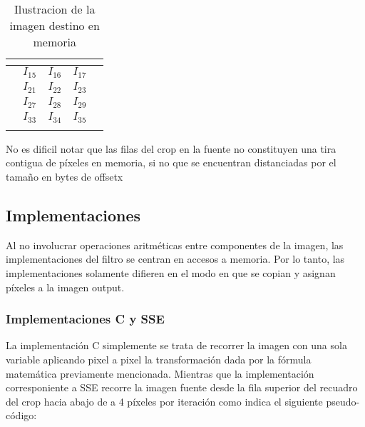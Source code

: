 \begin{table}[h]
\centering
\mem
\begin{tabular}{l|c|c|c|l}
& \multicolumn{1}{l|}{}       & \multicolumn{1}{l|}{}       & \multicolumn{1}{l|}{}      &  \\ \hline
 & \cellcolor[HTML]{FD6864}$I_{15}$ & \cellcolor[HTML]{FD6864}$I_{16}$  & \cellcolor[HTML]{FD6864}$I_{17}$ &  \\ \hline
 & \cellcolor[HTML]{FD6864}$I_{21}$ & \cellcolor[HTML]{FD6864}$I_{22}$  & \cellcolor[HTML]{FD6864}$I_{23}$ &  \\ \hline 
   & \cellcolor[HTML]{FD6864}$I_{27}$  & \cellcolor[HTML]{FD6864}$I_{28}$  & \cellcolor[HTML]{FD6864}$I_{29}$ &  \\ \hline
 & \cellcolor[HTML]{FD6864}$I_{33}$  & \cellcolor[HTML]{FD6864}$I_{34}$  & \cellcolor[HTML]{FD6864}$I_{35}$ &  \\ \hline
  & \multicolumn{1}{l|}{}       & \multicolumn{1}{l|}{}       & \multicolumn{1}{l|}{}      &
\end{tabular}
\caption{Ilustracion de la imagen destino en memoria}
\end{table}




No es dificil notar que las filas del crop en la fuente no constituyen una tira contigua de píxeles en memoria, si no que se encuentran distanciadas por el tamaño en bytes de offsetx

\subsection{Implementaciones}
Al no involucrar operaciones aritméticas entre componentes de la imagen, las implementaciones del filtro se centran en accesos a memoria. Por lo tanto, las implementaciones solamente difieren en el modo en que se copian y asignan píxeles a la imagen output. 
\subsubsection{Implementaciones C y SSE}
La implementación C simplemente se trata de recorrer la imagen con una sola variable aplicando pixel a pixel la transformación dada por la fórmula matemática previamente mencionada. Mientras que la implementación corresponiente a SSE recorre la imagen fuente desde la fila superior del recuadro del crop hacia abajo de a 4 píxeles por iteración como indica el siguiente pseudo-código: 


